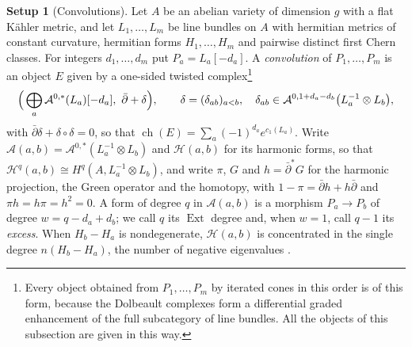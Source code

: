 \documentclass[11pt,reqno]{amsart}
\theoremstyle{plain}
\theoremstyle{definition}
\newtheorem{setupenv}[theorem]{Setup}
\theoremstyle{remark}
\newcommand{\cH}{\mathcal{H}}
\newcommand{\cA}{\mathcal{A}}
\DeclareMathOperator{\ch}{ch}
\DeclareMathOperator{\Ext}{Ext}
\begin{document}
\begin{setupenv}[Convolutions]\label{setup:convolution}
Let $A$ be an abelian variety of dimension $g$ with a flat K\"ahler metric,
and let $L_{1},\dots,L_{m}$ be line bundles on $A$ with hermitian metrics of
constant curvature, hermitian forms $H_{1},\dots,H_{m}$ and pairwise distinct
first Chern classes. For integers $d_{1},\dots,d_{m}$ put
$P_{a}=L_{a}[-d_{a}]$. A \emph{convolution} of $P_{1},\dots,P_{m}$ is an
object $E$ given by a one-sided twisted
complex\footnote{Every object obtained from $P_{1},\dots,P_{m}$ by iterated
cones in this order is of this form, because the Dolbeault complexes form a
differential graded enhancement of the full subcategory of line bundles. All
the objects of this subsection are given in this way.}
\[
  \Bigl(\,\bigoplus_{a}\cA^{0,*}(L_{a})[-d_{a}],\ \bar\partial+\delta\Bigr),
  \qquad
  \delta=(\delta_{ab})_{a<b},\quad
  \delta_{ab}\in\cA^{0,1+d_{a}-d_{b}}\bigl(L_{a}^{-1}\otimes L_{b}\bigr),
\]
with $\bar\partial\delta+\delta\circ\delta=0$, so that
$\ch(E)=\sum_{a}(-1)^{d_{a}}e^{c_{1}(L_{a})}$. Write
$\cA(a,b)=\cA^{0,*}(L_{a}^{-1}\otimes L_{b})$ and $\cH(a,b)$ for its harmonic
forms, so that $\cH^{q}(a,b)\cong H^{q}(A,L_{a}^{-1}\otimes L_{b})$, and write
$\pi$, $G$ and $h=\bar\partial^{*}G$ for the harmonic projection, the Green
operator and the homotopy, with $1-\pi=\bar\partial h+h\bar\partial$ and
$\pi h=h\pi=h^{2}=0$. A form of degree $q$ in $\cA(a,b)$ is a morphism
$P_{a}\to P_{b}$ of degree $w=q-d_{a}+d_{b}$; we call $q$ its $\Ext$ degree
and, when $w=1$, call $q-1$ its \emph{excess}. When $H_{b}-H_{a}$ is
nondegenerate, $\cH(a,b)$ is concentrated in the single degree
$n(H_{b}-H_{a})$, the number of negative eigenvalues \cite[Chapter~3]{BL04}.
\end{setupenv}
\end{document}
